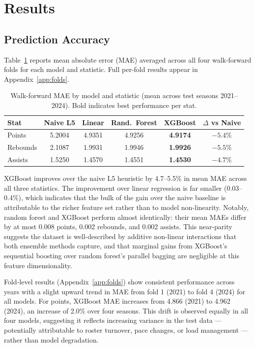 \documentclass[12pt, letterpaper]{article}
\begin{document}
\section{Results}
\label{sec:results}

\subsection{Prediction Accuracy}

Table~\ref{tab:mae} reports mean absolute error (MAE) averaged across
all four walk-forward folds for each model and statistic.
Full per-fold results appear in Appendix~\ref{app:folds}.

\begin{table}[H]
\centering
\caption{Walk-forward MAE by model and statistic (mean across test seasons
         2021--2024). Bold indicates best performance per stat.}
\label{tab:mae}
\begin{tabular}{lccccc}
\toprule
\textbf{Stat} & \textbf{Naive L5} & \textbf{Linear} & \textbf{Rand.\ Forest} & \textbf{XGBoost} & \textbf{$\Delta$ vs Naive} \\
\midrule
Points    & 5.2004 & 4.9351 & 4.9256 & \textbf{4.9174} & $-5.4\%$ \\
Rebounds  & 2.1087 & 1.9931 & 1.9946 & \textbf{1.9926} & $-5.5\%$ \\
Assists   & 1.5250 & 1.4570 & 1.4551 & \textbf{1.4530} & $-4.7\%$ \\
\bottomrule
\end{tabular}
\end{table}

XGBoost improves over the naive L5 heuristic by 4.7--5.5\% in mean MAE
across all three statistics.
The improvement over linear regression is far smaller (0.03--0.4\%),
which indicates that the bulk of the gain over the naive baseline is
attributable to the richer feature set rather than to model non-linearity.
Notably, random forest and XGBoost perform almost identically: their mean
MAEs differ by at most 0.008 points, 0.002 rebounds, and 0.002 assists.
This near-parity suggests the dataset is well-described by additive
non-linear interactions that both ensemble methods capture, and that
marginal gains from XGBoost's sequential boosting over random forest's
parallel bagging are negligible at this feature dimensionality.

Fold-level results (Appendix~\ref{app:folds}) show consistent performance
across years with a slight upward trend in MAE from fold 1 (2021) to fold 4
(2024) for all models.
For points, XGBoost MAE increases from 4.866 (2021) to 4.962 (2024),
an increase of 2.0\% over four seasons.
This drift is observed equally in all four models, suggesting it reflects
increasing variance in the test data --- potentially attributable to
roster turnover, pace changes, or load management --- rather than
model degradation.
\end{document}
